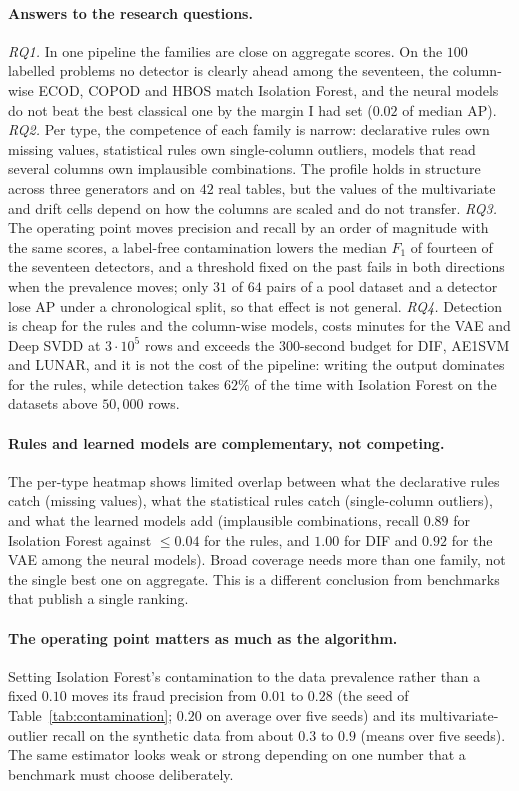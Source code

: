 \documentclass[conference]{IEEEtran}
\begin{document}
\paragraph{Answers to the research questions.}
\emph{RQ1.} In one pipeline the families are close on aggregate scores. On the $100$ labelled
problems no detector is clearly ahead among the seventeen, the column-wise ECOD, COPOD and HBOS
match Isolation Forest, and the neural models do not beat the best classical one by the margin I
had set ($0.02$ of median AP). \emph{RQ2.} Per type, the competence of each family is narrow:
declarative rules own missing values, statistical rules own single-column outliers, models that
read several columns own implausible combinations. The profile holds in structure across three
generators and on $42$ real tables, but the values of the multivariate and drift cells depend on
how the columns are scaled and do not transfer. \emph{RQ3.} The operating point moves precision
and recall by an order of magnitude with the same scores, a label-free contamination lowers the
median $F_1$ of fourteen of the seventeen detectors, and a threshold fixed on the past fails in both
directions when the prevalence moves; only $31$ of $64$ pairs of a pool dataset and a detector lose
AP under a chronological split, so that effect is not general. \emph{RQ4.} Detection is cheap
for the rules and the column-wise models, costs minutes for the VAE and Deep SVDD at $3\cdot10^5$ rows and exceeds the $300$-second budget for DIF, AE1SVM and LUNAR,
and it is not the cost of the pipeline: writing the output dominates for the rules, while detection
takes $62\%$ of the time with Isolation Forest on the datasets above $50{,}000$ rows.

\paragraph{Rules and learned models are complementary, not competing.}
The per-type heatmap shows limited overlap between what the declarative
rules catch (missing values), what the statistical rules catch
(single-column outliers), and what the learned models add (implausible
combinations, recall $0.89$ for Isolation Forest against $\le 0.04$ for
the rules, and $1.00$ for DIF and $0.92$ for the VAE among the neural models). Broad coverage needs more than one family, not the single
best one on aggregate. This is a different conclusion from benchmarks
that publish a single ranking.

\paragraph{The operating point matters as much as the algorithm.} Setting
Isolation Forest's contamination to the data prevalence rather than a
fixed $0.10$ moves its fraud precision from $0.01$ to $0.28$ (the seed
of Table~\ref{tab:contamination}; $0.20$ on average over five seeds) and its
multivariate-outlier recall on the synthetic data from about $0.3$ to
$0.9$ (means over five seeds).
The same estimator looks weak or strong depending on one number that a
benchmark must choose deliberately.
\end{document}
